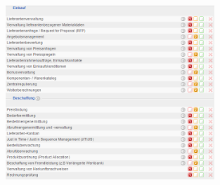 \documentclass[12pt]{article}
\begin{document}
\noindent
\begin{figure}[here!]
\centering
\includegraphics[width=0.7\textwidth]{images/tr20}
\end{figure}\FloatBarrier
\noindent
\end{document}
